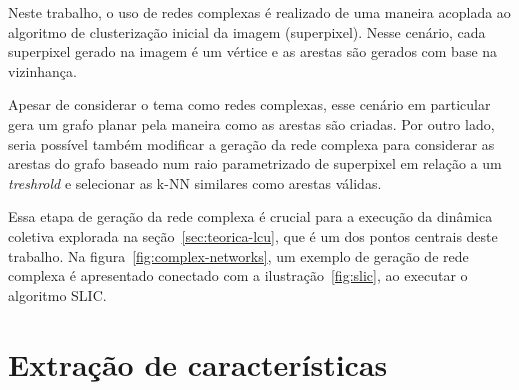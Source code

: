 Neste trabalho, o uso de redes complexas é realizado de uma maneira
acoplada ao algoritmo de clusterização inicial da imagem (superpixel). Nesse
cenário, cada superpixel gerado na imagem é um vértice e as arestas
são gerados com base na vizinhança.

Apesar de considerar o tema como redes complexas, esse cenário em
particular gera um grafo planar pela maneira como as arestas são
criadas. Por outro lado, seria possível também modificar a geração da
rede complexa para considerar as arestas do grafo baseado num raio
parametrizado de superpixel em relação a um \textit{treshrold} e
selecionar as \gls{k-NN} similares como arestas válidas.

Essa etapa de geração da rede complexa é crucial para a execução da
dinâmica coletiva explorada na seção~\ref{sec:teorica-lcu}, que é um dos
pontos centrais deste trabalho. Na figura~\ref{fig:complex-networks},
um exemplo de geração de rede complexa é apresentado conectado com a
ilustração~\ref{fig:slic}, ao executar o algoritmo SLIC.\@

\begin{figure}[t]
        \captionsetup{width=12cm}
		\centering
\end{figure}
\FloatBarrier{}

\section{Extração de características}\label{sec:extracao-caracteristicas}

